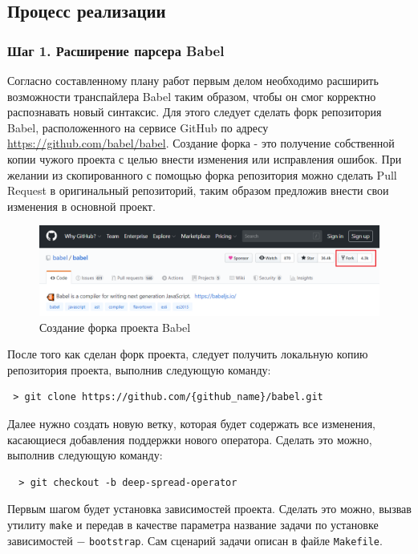 \documentclass[14pt, a4paper]{article}
\def\code#1{\texttt{#1}} %
\begin{document}
\subsection{Процесс реализации}
\subsubsection*{Шаг 1. Расширение парсера Babel}
Согласно составленному плану работ первым делом необходимо расширить возможности транспайлера Babel таким образом,
чтобы он смог корректно распознавать новый синтаксис. Для этого следует сделать форк репозитория Babel,
расположенного на сервисе GitHub по адресу \url{https://github.com/babel/babel}. Создание форка - это
получение собственной копии чужого проекта с целью внести изменения или исправления ошибок. При желании
из скопированного с помощью форка репозитория можно сделать Pull Request в оригинальный репозиторий,
таким образом предложив внести свои изменения в основной проект.
\begin{figure}[h!]
  \centering
  \includegraphics[scale=0.55]{img/babel_fork.PNG}
  \caption{Создание форка проекта Babel}
  \label{babel_fork}
\end{figure}

После того как сделан форк проекта, следует получить локальную копию репозитория проекта, выполнив следующую команду:
\begin{lstlisting}
 > git clone https://github.com/{github_name}/babel.git
\end{lstlisting}

Далее нужно создать новую ветку, которая будет содержать все изменения, касающиеся добавления поддержки нового оператора.
Сделать это можно, выполнив следующую команду:
\begin{lstlisting}
  > git checkout -b deep-spread-operator
\end{lstlisting}


Первым шагом будет установка зависимостей проекта. Сделать это можно, вызвав утилиту \code{make} и передав
в качестве параметра название задачи по установке зависимостей $-$ \code{bootstrap}. Сам сценарий задачи
описан в файле \code{Makefile}.
\end{document}
